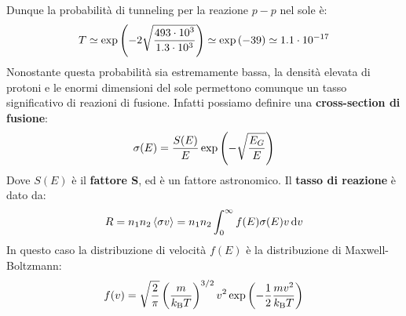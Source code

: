 Dunque la probabilità di tunneling per la reazione $p-p$ nel sole è:
\begin{equation}
    T \simeq \exp\left(-2 \sqrt{\dfrac{493 \cdot 10^3}{1.3 \cdot 10^3}}\right) \simeq \exp\left(-39\right) \simeq 1.1 \cdot 10^{-17}
\end{equation}
Nonostante questa probabilità sia estremamente bassa, la densità elevata di protoni e le enormi dimensioni del sole permettono comunque un tasso significativo di reazioni di fusione. Infatti possiamo definire una \textbf{cross-section di fusione}:
\begin{equation}
    \sigma(E) = \dfrac{S(E)}{E} \exp\left(-\sqrt{\dfrac{E_G}{E}}\right)
\end{equation}
Dove $S(E)$ è il \textbf{fattore S}, ed è un fattore astronomico. Il \textbf{tasso di reazione} è dato da:
\begin{equation}
    R = n_1 n_2 \left\langle \sigma v \right\rangle = n_1 n_2 \int_0^{\infty} f(E) \sigma(E) v \dd{v}
\end{equation}
In questo caso la distribuzione di velocità $f(E)$ è la distribuzione di Maxwell-Boltzmann:
\begin{equation}
    f(v) = \sqrt{\dfrac{2}{\pi}} \left(\dfrac{m}{k_{\text{B}} T}\right)^{3/2} v^2\exp\left(-\dfrac{1}{2} \dfrac{m v^2}{k_{\text{B}} T}\right)
\end{equation}


